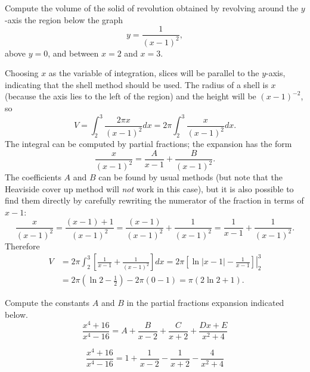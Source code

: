 \documentclass{ximera}
\begin{document}
\begin{question}%
Compute the volume of the solid of revolution obtained by revolving around the $y$-axis the region below the graph
\[ y = \frac{1}{(x-1)^2}, \]
above $y=0$, and between $x=2$ and $x=3$.
\begin{multiplechoice}
\choice{\(\displaystyle \pi\)}
\end{multiplechoice}
\begin{feedback}
Choosing $x$ as the variable of integration, slices will be parallel to the $y$-axis, indicating that the shell method should be used. The radius of a shell is $x$ (because the axis lies to the left of the region) and the height will be $(x-1)^{-2}$, so 
\[ V = \int_2^3 \frac{2 \pi x}{(x-1)^2} dx = 2 \pi \int_2^3 \frac{x}{(x-1)^2} dx. \]
The integral can be computed by partial fractions; the expansion has the form
\[ \frac{x}{(x-1)^2} = \frac{A}{x-1} + \frac{B}{(x-1)^2}. \]
The coefficients $A$ and $B$ can be found by usual methods (but note that the Heaviside cover up method will \textit{not} work in this case), but it is also possible to find them directly by carefully rewriting the numerator of the fraction in terms of $x-1$:
\[ \frac{x}{(x-1)^2} = \frac{(x-1) + 1}{(x-1)^2} = \frac{(x-1)}{(x-1)^2} + \frac{1}{(x-1)^2} = \frac{1}{x-1} + \frac{1}{(x-1)^2}. \]
Therefore
\[ \begin{aligned} V & = 2 \pi \int_2^3 \left[ \frac{1}{x-1} + \frac{1}{(x-1)^2} \right] dx = 2 \pi \left. \left[ \ln |x-1| - \frac{1}{x-1} \right] \right|_{2}^3 \\
& = 2 \pi \left( \ln 2 - \frac{1}{2} \right) - 2 \pi \left( 0 - 1 \right) = \pi(2 \ln 2 + 1). \end{aligned}\]
\end{feedback}

\end{question}

\begin{question}%

Compute the constants \(A\) and \(B\) in the partial fractions expansion indicated below. 
\[ \frac{x^4 + 16}{x^4 - 16} =A +  \frac{B}{x-2} + \frac{C}{x+2} + \frac{Dx + E}{x^2 + 4} \]
\begin{multiplechoice}
\end{multiplechoice}
\begin{comments}
\[  \frac{x^4 + 16}{x^4 - 16} = 1 + \frac{1}{x-2} - \frac{1}{x+2} - \frac{4}{x^2+4} \]
\end{comments}


\end{question}
\end{document}
